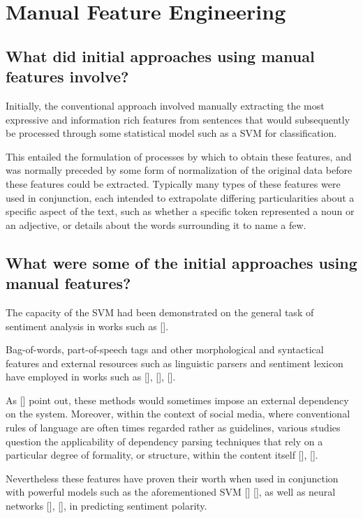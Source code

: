\documentclass[12pt, a4paper]{report}
\theoremstyle{definition}
\theoremstyle{definition}%
\theoremstyle{definition}%
\theoremstyle{definition}%
\theoremstyle{definition}%
\theoremstyle{definition}%
\renewcommand{\cite}[1]{[\citealp{#1}]}
\begin{document}
\section{Manual Feature Engineering}
\subsection{What did initial approaches using manual features involve?}
Initially, the conventional approach involved manually extracting the most expressive and information rich features from sentences that would subsequently be processed through some statistical model such as a SVM for classification.

This entailed the formulation of processes by which to obtain these features, and was normally preceded by some form of normalization of the original data before these features could be extracted. Typically many types of these features were used in conjunction, each intended to extrapolate differing particularities about a specific aspect of the text, such as whether a specific token represented a noun or an adjective, or details about the words surrounding it to name a few.

\subsection{What were some of the initial approaches using manual features?}
The capacity of the SVM had been demonstrated on the general task of sentiment analysis in works such as \cite{pang2002}.  

Bag-of-words, part-of-speech tags and other morphological and syntactical features and external resources such as linguistic parsers and sentiment lexicon have employed in works such as \cite{dong}, \cite{vo2015}, \cite{nguyen2015}. 

As \cite{tang2016b} point out, these methods would sometimes impose an external dependency on the system. Moreover, within the context of social media, where conventional rules of language are often times regarded rather as guidelines, various studies question the applicability of dependency parsing techniques that rely on a particular degree of formality, or structure, within the content itself \cite{tang2016b}, \cite{chen2017}.

Nevertheless these features have proven their worth when used in conjunction with powerful models such as the aforementioned SVM \cite{kiritchenko} \cite{wagner2014}, as well as neural networks \cite{dong}, \cite{vo2015}, in predicting sentiment polarity.
\end{document}
